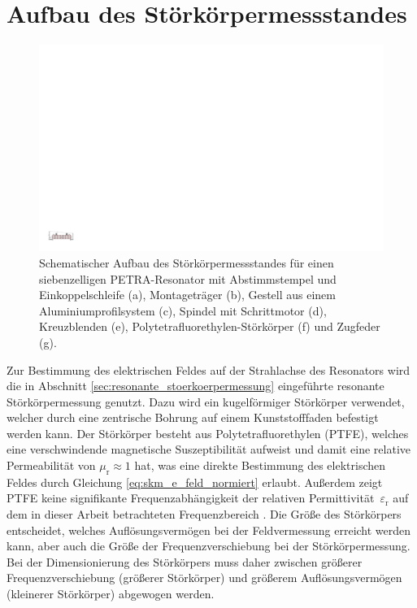 \section{Aufbau des Störkörpermessstandes}
\label{sec:aufbau_messstand}
\begin{figure}
	\centering
	\includegraphics[width=1.0\textheight]{./figs/cavity/messaufbau.pdf}
	\caption[Schematischer Aufbau des Störkörpermessstandes]{Schematischer Aufbau des Störkörpermessstandes für einen siebenzelligen PETRA-Resonator mit Abstimmstempel und Einkoppelschleife (a), Montageträger (b), Gestell aus einem Aluminiumprofilsystem (c), Spindel mit Schrittmotor (d), Kreuzblenden (e), Polytetrafluorethylen-Störkörper (f) und Zugfeder (g).}
	\label{fig:stoerkoerpermessstand}
\end{figure}
Zur Bestimmung des elektrischen Feldes auf der Strahlachse des Resonators wird die in Abschnitt \ref{sec:resonante_stoerkoerpermessung} eingeführte resonante Störkörpermessung genutzt.
Dazu wird ein kugelförmiger Störkörper verwendet, welcher durch eine zentrische Bohrung auf einem Kunststofffaden befestigt werden kann.
Der Störkörper besteht aus Polytetrafluorethylen (PTFE), welches eine verschwindende magnetische Suszeptibilität aufweist \cite{keyjeff} und damit eine relative Permeabilität von $\mu_\mathrm{r} \approx 1$ hat, was eine direkte Bestimmung des elektrischen Feldes durch Gleichung \eqref{eq:skm_e_feld_normiert} erlaubt.
Außerdem zeigt PTFE keine signifikante Frequenzabhängigkeit der relativen Permittivität~$\varepsilon_\mathrm{r}$ auf dem in dieser Arbeit betrachteten Frequenzbereich \cite[S.\ 2201]{CRC}.
Die Größe des Störkörpers entscheidet, welches Auflösungsvermögen bei der Feldvermessung erreicht werden kann, aber auch die Größe der Frequenzverschiebung bei der Störkörpermessung.
Bei der Dimensionierung des Störkörpers muss daher zwischen größerer Frequenzverschiebung (größerer Störkörper) und größerem Auflösungsvermögen (kleinerer Störkörper) abgewogen werden.

